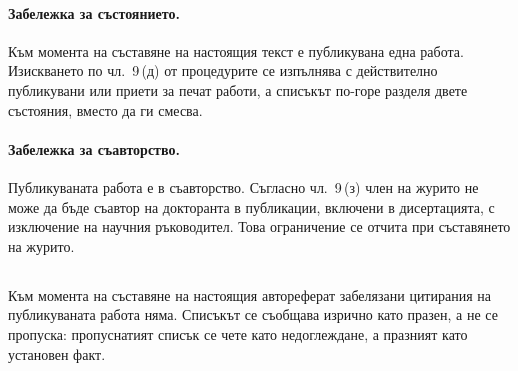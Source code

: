 \paragraph{Забележка за състоянието.} Към момента на съставяне на настоящия текст е
публикувана една работа. Изискването по чл.~9\,(д) от процедурите се изпълнява с действително
публикувани или приети за печат работи, а списъкът по-горе разделя двете състояния, вместо да
ги смесва.

\paragraph{Забележка за съавторство.} Публикуваната работа е в съавторство. Съгласно
чл.~9\,(з) член на журито не може да бъде съавтор на докторанта в публикации, включени в
дисертацията, с изключение на научния ръководител. Това ограничение се отчита при съставянето
на журито.

\subsection*{}

Към момента на съставяне на настоящия автореферат забелязани цитирания на публикуваната
работа няма. Списъкът се съобщава изрично като празен, а не се пропуска: пропуснатият списък
се чете като недоглеждане, а празният като установен факт.
